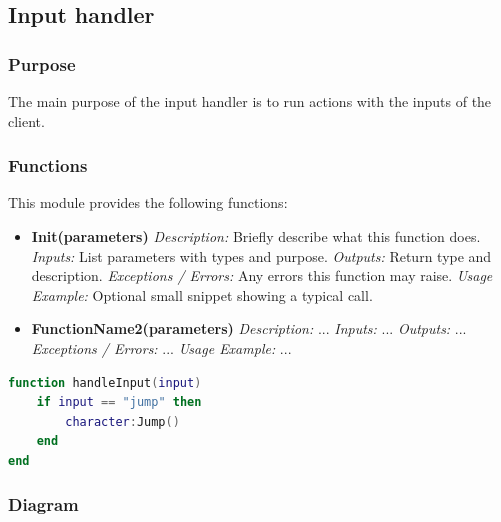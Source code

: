 \subsection{Input handler}

\subsubsection{Purpose}
The main purpose of the input handler is to run actions with the inputs of the client.

\subsubsection{Functions}

This module provides the following functions:

\begin{itemize}
    \item \textbf{Init(parameters)}  
    \textit{Description:} Briefly describe what this function does.  
    \textit{Inputs:} List parameters with types and purpose.  
    \textit{Outputs:} Return type and description.  
    \textit{Exceptions / Errors:} Any errors this function may raise.  
    \textit{Usage Example:} Optional small snippet showing a typical call.
    
    \item \textbf{FunctionName2(parameters)}  
    \textit{Description:} ...  
    \textit{Inputs:} ...  
    \textit{Outputs:} ...  
    \textit{Exceptions / Errors:} ...  
    \textit{Usage Example:} ...
\end{itemize}



\begin{lstlisting}[language=Lua, caption={Example: handleInput function}]
function handleInput(input)
    if input == "jump" then
        character:Jump()
    end
end
\end{lstlisting}

\subsubsection{Diagram}

